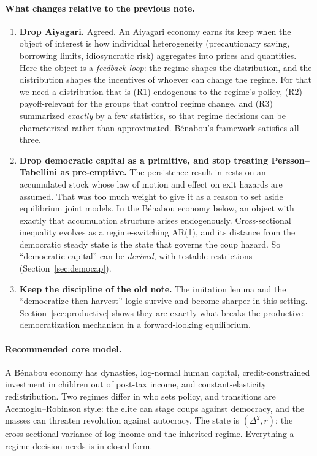 \documentclass[11pt]{article}
\theoremstyle{remark}
\begin{document}
\paragraph{What changes relative to the previous note.}
\begin{enumerate}
\item \textbf{Drop Aiyagari.}  Agreed.  An Aiyagari economy earns its keep when the object of interest is how individual heterogeneity (precautionary saving, borrowing limits, idiosyncratic risk) aggregates into prices and quantities.  Here the object is a \emph{feedback loop}: the regime shapes the distribution, and the distribution shapes the incentives of whoever can change the regime.  For that we need a distribution that is (R1) endogenous to the regime's policy, (R2) payoff-relevant for the groups that control regime change, and (R3) summarized \emph{exactly} by a few statistics, so that regime decisions can be characterized rather than approximated.  B\'enabou's framework satisfies all three.
\item \textbf{Drop democratic capital as a primitive, and stop treating Persson--Tabellini as pre-emptive.}  The persistence result in \citet{PerssonTabellini2009} rests on an accumulated stock whose law of motion and effect on exit hazards are assumed.  That was too much weight to give it as a reason to set aside equilibrium joint models.  In the B\'enabou economy below, an object with exactly that accumulation structure arises endogenously.  Cross-sectional inequality evolves as a regime-switching AR(1), and its distance from the democratic steady state is the state that governs the coup hazard.  So ``democratic capital'' can be \emph{derived}, with testable restrictions (Section~\ref{sec:democap}).
\item \textbf{Keep the discipline of the old note.}  The imitation lemma and the ``democratize-then-harvest'' logic survive and become sharper in this setting.  Section~\ref{sec:productive} shows they are exactly what breaks the productive-democratization mechanism in a forward-looking equilibrium.
\end{enumerate}

\paragraph{Recommended core model.}  A B\'enabou economy has dynasties, log-normal human capital, credit-constrained investment in children out of post-tax income, and constant-elasticity redistribution.  Two regimes differ in who sets policy, and transitions are Acemoglu--Robinson style: the elite can stage coups against democracy, and the masses can threaten revolution against autocracy.  The state is $(\Delta^2,r)$: the cross-sectional variance of log income and the inherited regime.  Everything a regime decision needs is in closed form.
\end{document}
